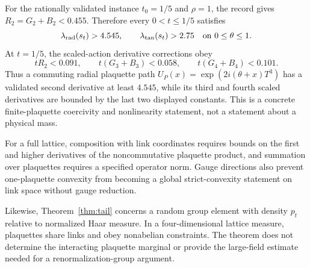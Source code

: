For the rationally validated instance $t_0=1/5$ and $\rho=1$, the record gives
$R_2=G_2+B_2<0.455$.  Therefore every $0<t\le1/5$ satisfies
\begin{equation}\label{eq:numeric-convexity}
 \lambda_{\rm rad}(s_t)>4.545,\qquad
 \lambda_{\rm tan}(s_t)>2.75
 \quad\text{on }0\le\theta\le1.
\end{equation}
At $t=1/5$, the scaled-action derivative corrections obey
\[
 tR_2<0.091,\qquad
 t(G_3+B_3)<0.058,\qquad
 t(G_4+B_4)<0.101.
\]
Thus a commuting radial plaquette path
$U_P(x)=\exp(2i(\theta+x)T^3)$ has a validated second derivative at least
$4.545$, while its third and fourth scaled derivatives are bounded by the
last two displayed constants.  This is a concrete finite-plaquette
coercivity and nonlinearity statement, not a statement about a physical mass.

For a full lattice, composition with link coordinates requires bounds on the
first and higher derivatives of the noncommutative plaquette product, and
summation over plaquettes requires a specified operator norm.  Gauge
directions also prevent one-plaquette convexity from becoming a global
strict-convexity statement on link space without gauge reduction.

Likewise, Theorem~\ref{thm:tail} concerns a random group element with density
$p_t$ relative to normalized Haar measure.  In a four-dimensional lattice
measure, plaquettes share links and obey nonabelian constraints.  The theorem
does not determine the interacting plaquette marginal or provide the
large-field estimate needed for a renormalization-group argument.
